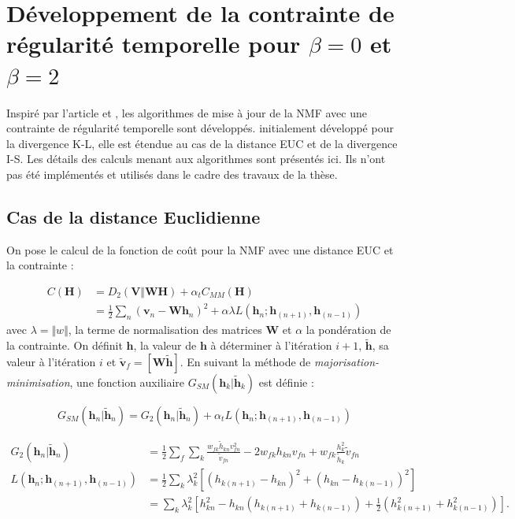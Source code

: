 \chapter{Développement de la contrainte de régularité temporelle pour $\beta = 0$ et $\beta = 2$}\label{annex:smoothNMF}

Inspiré par l'article \cite{essid2013smooth} et \cite{fevotte_algorithms_2011}, les algorithmes de mise à jour de la NMF avec une contrainte de régularité temporelle sont développés. initialement développé pour la divergence K-L, elle est étendue au cas de la distance EUC et de la divergence I-S. Les détails des calculs menant aux algorithmes sont présentés ici. Ils n'ont pas été implémentés et utilisés dans le cadre des travaux de la thèse.

\section{Cas de la distance Euclidienne}
On pose le calcul de la fonction de coût pour la NMF avec une distance EUC et la contrainte :

\begin{align}
C(\mathbf{H}) &= D_2(\mathbf{V} \Vert \mathbf{WH}) + \alpha_t C_{MM}(\mathbf{H})\\
 &= \frac{1}{2}\sum_n(\mathbf{v}_n-\mathbf{Wh}_n)^2+\alpha\lambda L(\mathbf{h}_{n}; \mathbf{h}_{(n+1)}, \mathbf{h}_{(n-1)}) 
\end{align}
avec $\lambda = \Vert w \Vert$, la terme de normalisation des matrices $\mathbf{W}$ et $\alpha$ la pondération de la contrainte. On définit $\mathbf{h}$, la valeur de $\mathbf{h}$ à déterminer à l'itération $i+1$, $\mathbf{\tilde{h}}$, sa valeur à l'itération $i$ et $\mathbf{\tilde{v}}_f = \left[\mathbf{W}\tilde{\textbf{h}}\right]$.
En suivant la méthode de \textit{majorisation-minimisation}, une fonction auxiliaire $G_{SM}(\mathbf{h}_{k}\vert \mathbf{\tilde{h}}_{k})$ est définie : 

\begin{equation}
G_{SM}(\mathbf{h}_{n}\vert \mathbf{\tilde{h}}_{n}) = G_{2}(\mathbf{h}_{n}\vert \mathbf{\tilde{h}}_{n})+\alpha_t L(\mathbf{h}_{n}; \mathbf{h}_{(n+1)}, \mathbf{h}_{(n-1)})
\end{equation}


\begin{align}
G_{2}(\mathbf{h}_{n}\vert \mathbf{\tilde{h}}_{n}) &= \frac{1}{2}\sum_{f} \sum_k \frac{w_{fk} \tilde{h}_{kn} v_{fn}^2}{\tilde{v}_{fn}}-2 w_{fk} h_{kn} v_{fn}+w_{fk}\frac{h_{k}^2}{\tilde{h}_{k}}\tilde{v}_{fn}
\\
L(\mathbf{h}_{n}; \mathbf{h}_{(n+1)}, \mathbf{h}_{(n-1)}) &= \frac{1}{2}\sum_{k}\lambda_k^2 \left[ \left(h_{k(n+1)}-h_{kn}\right)^2+\left(h_{kn}-h_{k(n-1)}\right)^2 \right]\\
&= \sum_k \lambda_k^2 \left[ h_{kn}^2- h_{kn}\left(h_{k(n+1)}+h_{k(n-1)}\right)+\frac{1}{2} \left(h_{k(n+1)}^2+h_{k(n-1)}^2\right) \right].
\end{align}
 
